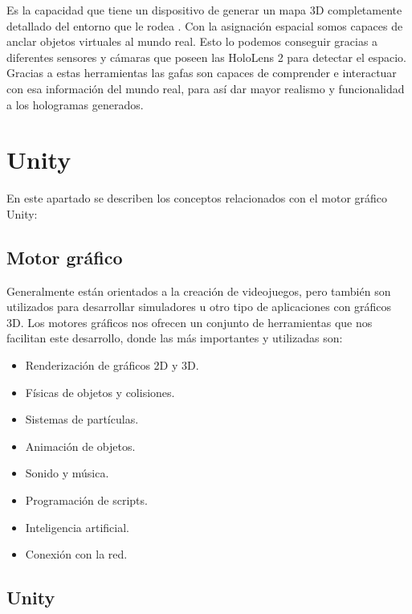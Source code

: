 Es la capacidad que tiene un dispositivo de generar un mapa 3D completamente detallado del entorno que le rodea \cite{microsoft:spatialmapping}. Con la asignación espacial somos capaces de anclar objetos virtuales al mundo real. Esto lo podemos conseguir gracias a diferentes sensores y cámaras que poseen las HoloLens 2 para detectar el espacio. Gracias a estas herramientas las gafas son capaces de comprender e interactuar con esa información del mundo real, para así dar mayor realismo y funcionalidad a los hologramas generados. 


\section{Unity}

En este apartado se describen los conceptos relacionados con el motor gráfico Unity: 

\subsection{Motor gráfico}

Generalmente están orientados a la creación de videojuegos, pero también son utilizados para desarrollar simuladores u otro tipo de aplicaciones con gráficos 3D. Los motores gráficos \cite{blogthinkbig:motorgrafico} nos ofrecen un conjunto de herramientas que nos facilitan este desarrollo, donde las más importantes y utilizadas son:
\begin{itemize}
	\item Renderización de gráficos 2D y 3D.
	\item Físicas de objetos y colisiones.
	\item Sistemas de partículas.
	\item Animación de objetos.
	\item Sonido y música.
	\item Programación de scripts.
	\item Inteligencia artificial.
	\item Conexión con la red.
	
\end{itemize}
\subsection{Unity}

